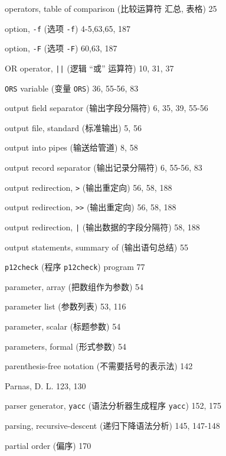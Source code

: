 \begin{multicols}{2}
\hangindent=2pc  operators, table of comparison (比较运算符
汇总, 表格) 25

\hangindent=2pc  option, \verb'-f' (选项 \verb'-f') 4-5,63,65, 187

\hangindent=2pc  option, \verb'-F' (选项 \verb'-F') 60,63, 187

\hangindent=2pc  OR operator, \verb'||' (逻辑 ``或'' 运算符)
10, 31, 37

\hangindent=2pc  \verb'ORS' variable (变量 \verb'ORS') 36, 55-56, 83

\hangindent=2pc  output field separator (输出字段分隔符)
6, 35, 39, 55-56

\hangindent=2pc  output file, standard (标准输出) 5, 56

\hangindent=2pc  output into pipes (输送给管道) 8, 58

\hangindent=2pc  output record separator (输出记录分隔符)
6, 55-56,  83

\hangindent=2pc  output redirection, \verb'>' (输出重定向)
56, 58, 188

\hangindent=2pc  output redirection, \verb'>>' (输出重定向) 56, 58, 188

\hangindent=2pc  output redirection, \verb'|'
(输出数据的字段分隔符) 58, 188

\hangindent=2pc  output statements, summary of (输出语句总结) 55

\hangindent=2pc  \verb'p12check' (程序 \verb'p12check') program 77

\hangindent=2pc  parameter, array (把数组作为参数) 54

\hangindent=2pc  parameter list (参数列表) 53, 116

\hangindent=2pc  parameter, scalar (标题参数) 54

\hangindent=2pc  parameters, formal (形式参数) 54

\hangindent=2pc  parenthesis-free notation (不需要括号的表示法) 142

\hangindent=2pc  Parnas, D. L. 123, 130

\hangindent=2pc  parser generator, \verb'yacc'
(语法分析器生成程序 \verb'yacc') 152, 175

\hangindent=2pc  parsing, recursive-descent (递归下降语法分析)
145, 147-148

\hangindent=2pc  partial order (偏序) 170


\end{multicols}
